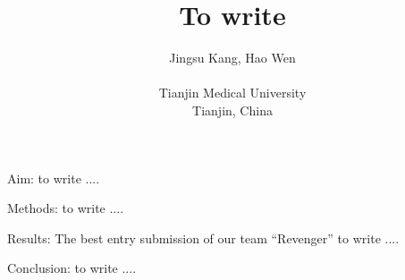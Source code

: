 \documentclass{cinc-abstract}
\begin{document}
\title{To write}

\author {Jingsu Kang, Hao Wen\\ %
\ \\ %
Tianjin Medical University\\  %
Tianjin, China} %

\maketitle



Aim: to write ....

Methods: to write ....

Results: The best entry submission of our team ``Revenger'' to write ....

Conclusion: to write ....
\end{document}
